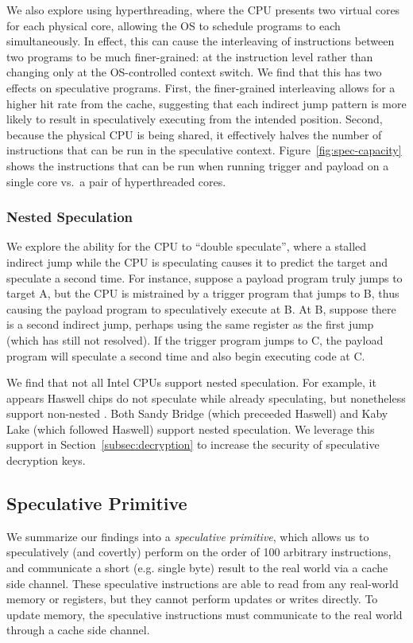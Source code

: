 We also explore using hyperthreading, where the CPU presents two virtual cores
for each physical core, allowing the OS to schedule programs to each
simultaneously. In effect, this can cause the interleaving of instructions
between two programs to be much finer-grained: at the instruction level rather
than changing only at the OS-controlled context switch. We find that this
has two effects on speculative programs. First, the finer-grained interleaving
allows for a higher hit rate from the cache, suggesting that each indirect jump
pattern is more likely to result in speculatively executing from the intended
position. %
Second, because the physical CPU is being shared, it effectively halves the
number of instructions that can be run in the speculative context.
Figure~\ref{fig:spec-capacity} shows the instructions that can be run when
running trigger and payload on a single core vs.\ a pair of hyperthreaded cores.

\subsubsection{Nested Speculation}

We explore the ability for the CPU to ``double speculate'', where a stalled
indirect jump while the CPU is speculating causes it to predict the target and
speculate a second time. For instance, suppose a payload program truly jumps to
target A, but the CPU is mistrained by a trigger program that jumps to B, thus
causing the payload program to speculatively execute at B. At B, suppose there
is a second indirect jump, perhaps using the same register as the first jump
(which has still not resolved). If the trigger program jumps to C, the payload
program will speculate a second time and also begin executing code at C.

We find that not all Intel CPUs support nested speculation. For
example, it appears Haswell chips do not speculate while already speculating,
but nonetheless support non-nested \speculake. Both Sandy Bridge (which
preceeded Haswell) and Kaby Lake (which followed Haswell) support nested
speculation.
We leverage this support in Section~\ref{subsec:decryption} to
increase the security of speculative decryption keys.


\subsection{Speculative Primitive}

We summarize our findings into a \emph{speculative primitive}, which allows us to
speculatively (and covertly) perform on the order of 100 arbitrary
instructions, and communicate a short (e.g. single byte) result to the real
world via a cache side channel. These speculative instructions are able to read
from any real-world memory or registers, but they cannot perform updates or
writes directly. To update memory, the speculative instructions must communicate
to the real world through a cache side channel.

